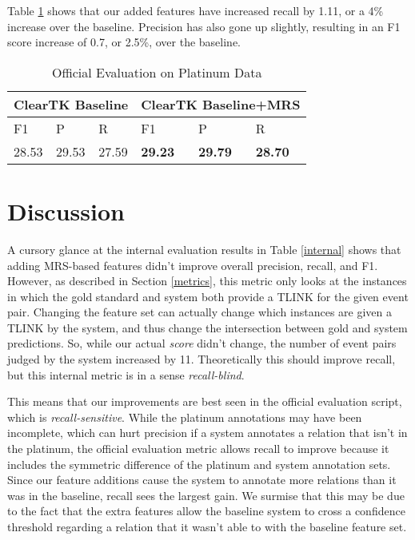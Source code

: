 \documentclass[11pt]{article}
\begin{document}
Table \ref{official} shows that our added features have increased recall by 1.11, or a 4\% increase over the baseline. Precision has also gone up slightly, resulting in an F1 score increase of 0.7, or 2.5\%, over the baseline.

\begin{table}[H]
\centering
\label{official}
\begin{tabular}{|l|l|l|l|l|l|}
\hline
\multicolumn{3}{|l|}{ClearTK Baseline} & \multicolumn{3}{l|}{ClearTK Baseline+MRS} \\ \hline
F1            & P             & R             & F1            & P            & R            \\ \hline
28.53       & 29.53      & 27.59       & \textbf{29.23}       & \textbf{29.79}      & \textbf{28.70}        \\ \hline
\end{tabular}
\caption{Official Evaluation on Platinum Data \label{official}}
\end{table}


\section{Discussion}
\label{discussion}

A cursory glance at the internal evaluation results in Table \ref{internal} shows that adding MRS-based features didn't improve overall precision, recall, and F1. However, as described in Section \ref{metrics}, this metric only looks at the instances in which the gold standard and system both provide a TLINK for the given event pair. Changing the feature set can actually change which instances are given a TLINK by the system, and thus change the intersection between gold and system predictions. So, while our actual \emph{score} didn't change, the number of event pairs judged by the system increased by 11. Theoretically this should improve recall, but this internal metric is in a sense \emph{recall-blind}.

This means that our improvements are best seen in the official evaluation script, which is \emph{recall-sensitive}. While the platinum annotations may have been incomplete, which can hurt precision if a system annotates a relation that isn't in the platinum, the official evaluation metric allows recall to improve because it includes the symmetric difference of the platinum and system annotation sets. Since our feature additions cause the system to annotate more relations than it was in the baseline, recall sees the largest gain. We surmise that this may be due to the fact that the extra features allow the baseline system to cross a confidence threshold regarding a relation that it wasn't able to with the baseline feature set.
\end{document}
